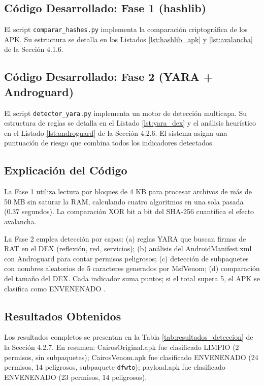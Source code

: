 \documentclass[12pt,a4paper]{article}
\begin{document}
\subsection{Código Desarrollado: Fase 1 (hashlib)}

El script \texttt{comparar\_hashes.py} implementa la comparación
criptográfica de los APK. Su estructura se detalla en los Listados
\ref{lst:hashlib_apk} y \ref{lst:avalancha} de la Sección 4.1.6.

\subsection{Código Desarrollado: Fase 2 (YARA + Androguard)}

El script \texttt{detector\_yara.py} implementa un motor de detección
multicapa. Su estructura de reglas se detalla en el Listado
\ref{lst:yara_dex} y el análisis heurístico en el Listado
\ref{lst:androguard} de la Sección 4.2.6. El sistema asigna una
puntuación de riesgo que combina todos los indicadores detectados.

\subsection{Explicación del Código}

La Fase 1 utiliza lectura por bloques de 4 KB para procesar archivos de
más de 50 MB sin saturar la RAM, calculando cuatro algoritmos en una
sola pasada (0.37 segundos). La comparación XOR bit a bit del SHA-256
cuantifica el efecto avalancha.

La Fase 2 emplea detección por capas: (a) reglas YARA que buscan firmas
de RAT en el DEX (reflexión, red, servicios); (b) análisis del
AndroidManifest.xml con Androguard para contar permisos peligrosos; (c)
detección de subpaquetes con nombres aleatorios de 5 caracteres
generados por MsfVenom; (d) comparación del tamaño del DEX. Cada
indicador suma puntos; si el total supera 5, el APK se clasifica como
ENVENENADO \cite{huacac2026}.

\subsection{Resultados Obtenidos}

Los resultados completos se presentan en la Tabla
\ref{tab:resultados_deteccion} de la Sección 4.2.7. En resumen:
CairosOriginal.apk fue clasificado LIMPIO (2 permisos, sin subpaquetes);
CairosVenom.apk fue clasificado ENVENENADO (24 permisos, 14 peligrosos,
subpaquete \texttt{dfwto}); payload.apk fue clasificado ENVENENADO (23
permisos, 14 peligrosos).
\end{document}
